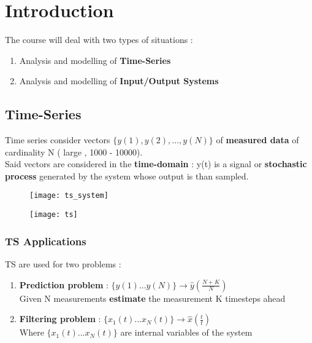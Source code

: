
\section{Introduction}
The course will deal with two types of situations :
\begin{enumerate}
\item Analysis and modelling of \textbf{Time-Series}
\item Analysis and modelling of \textbf{Input/Output Systems}
\end{enumerate}

\subsection{Time-Series} 
Time series consider vectors  $\{y(1), y(2) , ... , y(N)\}$  of \textbf{measured data} of cardinality N ( large , 1000 - 10000).\\
Said vectors are considered in the \textbf{time-domain} : y(t) is a signal or \textbf{stochastic process} generated by the system whose output is than sampled.

\begin{figure}[!h]
\begin{minipage}{.5\textwidth}
  \centering
  \texttt{[image: ts\_system]}
\end{minipage}%
  \begin{minipage}{.5\textwidth}
  \centering
  \texttt{[image: ts]}
\end{minipage}%
\end{figure}

\subsubsection{TS Applications}
TS are used for two problems : 
\begin{enumerate}
\item \textbf{Prediction problem} : $\{ y(1) ... y(N) \} \rightarrow \hat{y} (\frac{N+K}{N})$ \\ Given N measurements \textbf{estimate} the measurement K timesteps ahead
\item \textbf{Filtering problem} : $\{ x_1(t) ... x_N(t) \} \rightarrow \hat{x} (\frac{t}{t})$ \\Where $\{ x_1(t) ... x_N(t) \}$ are internal variables of the system
\end{enumerate}
\vfill

